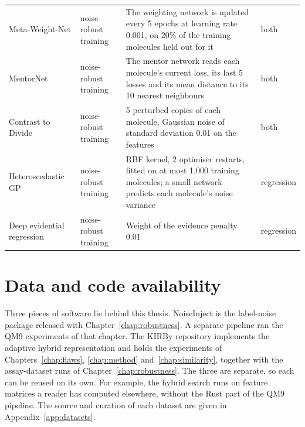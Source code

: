 {\begin{longtable}{@{}p{2.9cm}p{2.0cm}p{7.3cm}p{1.6cm}@{}}
Meta-Weight-Net & noise-robust training & The weighting network is updated every 5 epochs at learning rate 0.001, on 20\% of the training molecules held out for it & both \\
MentorNet & noise-robust training & The mentor network reads each molecule's current loss, its last 5 losses and its mean distance to its 10 nearest neighbours & both \\
Contrast to Divide & noise-robust training & 5 perturbed copies of each molecule, Gaussian noise of standard deviation 0.01 on the features & both \\
\midrule
Heteroscedastic GP & noise-robust training & RBF kernel, 2 optimiser restarts, fitted on at most 1{,}000 training molecules; a small network predicts each molecule's noise variance & regression \\
Deep evidential regression & noise-robust training & Weight of the evidence penalty 0.01 & regression \\
\bottomrule
\end{longtable}
}

\chapter{Data and code availability}\label{app:availability}

Three pieces of software lie behind this thesis. NoiseInject is the label-noise package released with Chapter~\ref{chap:robustness}. A separate pipeline ran the QM9 experiments of that chapter. The KIRBy repository implements the adaptive hybrid representation and holds the experiments of Chapters~\ref{chap:flaws}, \ref{chap:method} and~\ref{chap:similarity}, together with the assay-dataset runs of Chapter~\ref{chap:robustness}. The three are separate, so each can be reused on its own. For example, the hybrid search runs on feature matrices a reader has computed elsewhere, without the Rust part of the QM9 pipeline. The source and curation of each dataset are given in Appendix~\ref{app:datasets}.

